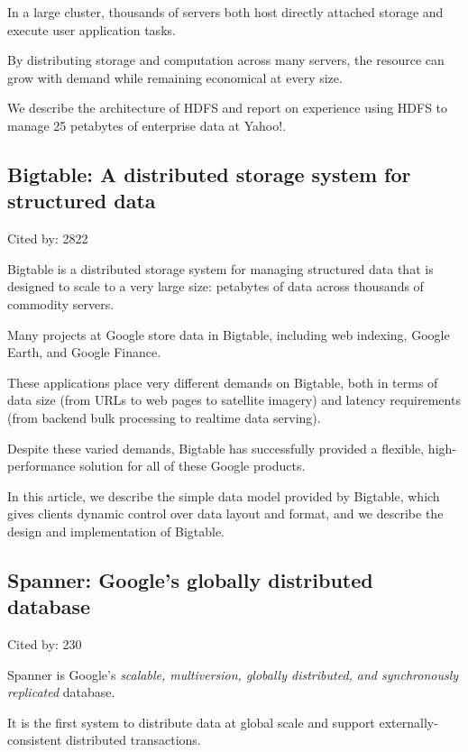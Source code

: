 \documentclass[a4paper,11pt]{article}
\begin{document}
{{{In a large cluster, 
thousands of servers both host directly attached storage and execute user application tasks. 

By distributing storage and computation across many servers, 
the resource can grow with demand while remaining economical at every size. 

We 
describe the architecture of HDFS and 
report on experience using HDFS to manage {\color{red} 25 petabytes} of enterprise data at Yahoo!.

}

\subsection*{Bigtable: A distributed storage system for structured data}
{\color{cyan} {\color{magenta} Cited by: 2822}

{\color{black} Bigtable\cite{bigtable}}
is a distributed storage system 
for managing structured data that is designed to scale to a very large size: 
petabytes of data across thousands of commodity servers. 

Many projects at Google store data in Bigtable, 
including web indexing, Google Earth, and Google Finance. 

These applications place very different demands on Bigtable, 
both in terms of 
data size (from URLs to web pages to satellite imagery) and 
latency requirements (from backend bulk processing to realtime data serving). 

Despite these varied demands, 
Bigtable has successfully provided a flexible,
high-performance solution for all of these Google products. 

In this article, 
we describe 
the simple data model provided by Bigtable, which gives clients dynamic control over data layout and format,
and we describe 
the design and implementation of Bigtable.

}

\subsection*{Spanner: Google's globally distributed database}
{\color{cyan} {\color{magenta} Cited by: 230}

{\color{black} Spanner\cite{spanner}}
is Google's 
{\color{red} \em scalable, multiversion, globally distributed, and synchronously replicated}
database. 

It is the first system to 
distribute data at global scale and 
support externally-consistent distributed transactions.

}}}
\end{document}
